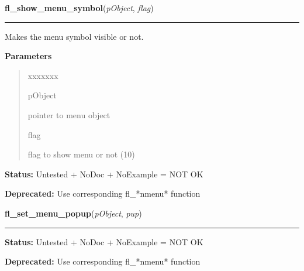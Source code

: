 \hspace{.8\funcindent}\begin{boxedminipage}{\funcwidth}

    \raggedright \textbf{fl\_show\_menu\_symbol}(\textit{pObject}, \textit{flag})

    \vspace{-1.5ex}

    \rule{\textwidth}{0.5\fboxrule}
\setlength{\parskip}{2ex}
    Makes the menu symbol visible or not.

\setlength{\parskip}{1ex}
      \textbf{Parameters}
      \vspace{-1ex}

      \begin{quote}
        \begin{Ventry}{xxxxxxx}

          \item[pObject]

          pointer to menu object

          \item[flag]

          flag to show menu or not (1{\textbar}0)

        \end{Ventry}

      \end{quote}

\textbf{Status:} Untested + NoDoc + NoExample = NOT OK



\textbf{Deprecated:} Use corresponding fl\_*nmenu* function



    \end{boxedminipage}

    \label{xformslib:library:fl_set_menu_popup}

    \vspace{0.5ex}

\hspace{.8\funcindent}\begin{boxedminipage}{\funcwidth}

    \raggedright \textbf{fl\_set\_menu\_popup}(\textit{pObject}, \textit{pup})

    \vspace{-1.5ex}

    \rule{\textwidth}{0.5\fboxrule}
\setlength{\parskip}{2ex}
\setlength{\parskip}{1ex}
\textbf{Status:} Untested + NoDoc + NoExample = NOT OK



\textbf{Deprecated:} Use corresponding fl\_*nmenu* function



    \end{boxedminipage}

